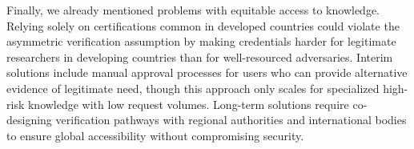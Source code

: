 \documentclass{article}
\theoremstyle{plain}
\theoremstyle{definition}
\theoremstyle{remark}
\begin{document}
Finally, we already mentioned problems with equitable access to knowledge.
Relying solely on certifications common in developed countries could violate the asymmetric verification assumption by making credentials harder for legitimate researchers in developing countries than for well-resourced adversaries.
Interim solutions include manual approval processes for users who can provide alternative evidence of legitimate need, though this approach only scales for specialized high-risk knowledge with low request volumes.
Long-term solutions require co-designing verification pathways with regional authorities and international bodies to ensure global accessibility without compromising security.

\end{document}
